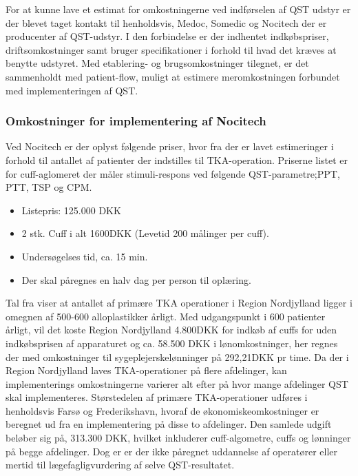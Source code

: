 For at kunne lave et estimat for omkostningerne ved indførselen af QST udstyr er der blevet taget kontakt til 
henholdsvis, Medoc, Somedic og Nocitech der er producenter af QST-udstyr. I den forbindelse er der indhentet indkøbspriser, driftsomkostninger samt bruger specifikationer i forhold til hvad det kræves at benytte udstyret. Med etablering- og brugsomkostninger tilegnet, er det sammenholdt med patient-flow, muligt at estimere meromkostningen forbundet med implementeringen af QST. 

\subsubsection{Omkostninger for implementering af Nocitech}\label{priser}
Ved Nocitech er der oplyst følgende priser, hvor fra der er lavet estimeringer i forhold til antallet af patienter der indstilles til TKA-operation. Priserne listet er for cuff-aglomeret der måler stimuli-respons ved følgende QST-parametre;PPT, PTT, TSP og CPM.

\begin{itemize}  
\item Listepris: 125.000 DKK
\item 2 stk. Cuff i  alt 1600DKK (Levetid 200 målinger per cuff).
\item Undersøgelses tid, ca. 15 min.
\item Der skal påregnes en halv dag per person til oplæring.
\end{itemize}

Tal fra \cite{aarsrapport2016} viser at antallet af primære TKA operationer i Region Nordjylland ligger i omegnen af 500-600 alloplastikker årligt. \citep{aarsrapport2016} Med udgangspunkt i 600 patienter årligt, vil det koste Region Nordjylland 4.800DKK for indkøb af cuffs for uden indkøbsprisen af apparaturet og ca. 58.500 DKK i lønomkostninger, her regnes der med omkostninger til sygeplejerskelønninger på 292,21DKK pr time. \citep{DST1} \citep{DST2} Da der i Region Nordjylland laves TKA-operationer på flere afdelinger, kan implementerings omkostningerne varierer alt efter på hvor mange afdelinger QST skal implementeres. Størstedelen af primære TKA-operationer udføres i henholdsvis Farsø og Frederikshavn, hvoraf de økonomiskeomkostninger er beregnet ud fra en implementering på disse to afdelinger. Den samlede udgift beløber sig på, 313.300 DKK, hvilket inkluderer cuff-algometre, cuffs og lønninger på begge afdelinger. Dog er er der ikke påregnet uddannelse af operatører eller mertid til lægefagligvurdering af selve QST-resultatet.

